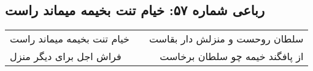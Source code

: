 \begin{center}
\section*{رباعی شماره ۵۷: خیام تنت بخیمه میماند راست}
\label{sec:sh057}
\begin{longtable}{l p{0.5cm} r}
خیام تنت بخیمه میماند راست
&&
سلطان روحست و منزلش دار بقاست
\\
فراش اجل برای دیگر منزل
&&
از پافگند خیمه چو سلطان برخاست
\\
\end{longtable}
\end{center}
